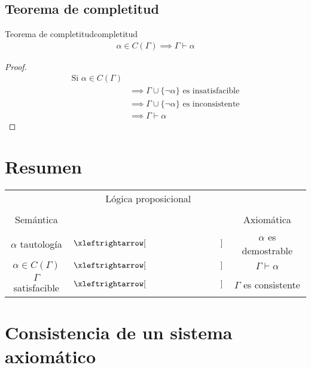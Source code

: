 \subsection{Teorema de completitud}

\begin{teorema}{Teorema de completitud}{completitud}
   \begin{gather*}
       \alpha \in C(\Gamma) \implies \Gamma \vdash \alpha
   \end{gather*} 
\end{teorema}


\begin{proof} \phantom{.}

    \begin{align*}
        \text{Si } \alpha \in C(\Gamma) & \\
        &\implies \Gamma \cup \{ \neg\alpha \} \text{ es insatisfacible} \\
        &\implies \Gamma \cup \{\neg\alpha\} \text{ es inconsistente} \\
        &\implies \Gamma \vdash \alpha
    \end{align*}
\end{proof}

\section{Resumen}
\begin{center}
   \renewcommand{\arraystretch}{1.5}
    \begin{tabular}{c c c}
        & Lógica proposicional & \\
        && \\
        Semántica & & Axiomática \\
        $\alpha$ tautología & 
        $\xleftrightarrow[\text{\phantom{Lógica proposicional}}]{}$ & 
        $\alpha$ es demostrable \\
        $\alpha \in C(\Gamma)$ & 
        $\xleftrightarrow[\text{\phantom{Lógica proposicional}}]{}$ & 
        $\Gamma \vdash \alpha$ \\
        $\Gamma$ satisfacible & 
        $\xleftrightarrow[\text{\phantom{Lógica proposicional}}]{}$ & 
        $\Gamma$ es consistente
    \end{tabular}
\end{center}

\section{Consistencia de un sistema axiomático}

